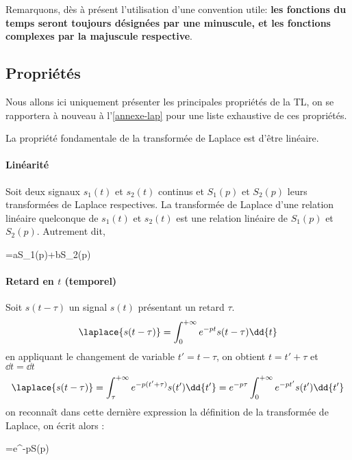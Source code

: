 Remarquons, dès à présent l'utilisation d'une convention utile: 
\textbf{les fonctions du temps seront toujours désignées par une
minuscule, et les fonctions complexes par la majuscule respective}.

\subsection{Propriétés}
Nous allons ici uniquement présenter les principales propriétés de la TL, 
on se rapportera à nouveau à l'\cref{annexe-lap} pour 
une liste exhaustive de ces propriétés.

La propriété fondamentale de la transformée de Laplace est d'être linéaire.
\paragraph{Linéarité}
Soit deux signaux $s_1(t)$ et $s_2(t)$ continus et $S_1(p)$ et $S_2(p)$ leurs
transformées de Laplace respectives. La transformée de Laplace d'une 
relation linéaire quelconque de $s_1(t)$ et $s_2(t)$ est une relation linéaire 
de $S_1(p)$ et $S_2(p)$. Autrement dit,
\begin{bequation}
	=aS_1(p)+bS_2(p)
\end{bequation}

\paragraph{Retard en $t$ (temporel)}
Soit $s(t-\tau)$ un signal $s(t)$ présentant un retard $\tau$.
$$
\laplace{s(t-\tau)}=\int_{0}^{+\infty} e^{-pt}s(t-\tau)\dd{t}
$$
en appliquant le changement de variable $t'=t-\tau$, on obtient $t=t'+\tau$ 
et $\dd{t}=\dd{t}$
$$
\laplace{s(t-\tau)}
=\int_{\tau}^{+\infty} e^{-p(t'+\tau)}s(t')\dd{t'}
=e^{-p\tau}\int_{0}^{+\infty} e^{-pt'}s(t')\dd{t'}
$$
on reconnaît dans cette dernière expression la définition de la 
transformée de Laplace, on écrit alors :
\begin{bequation}
    =e^{-p\tau}S(p)
\end{bequation}
